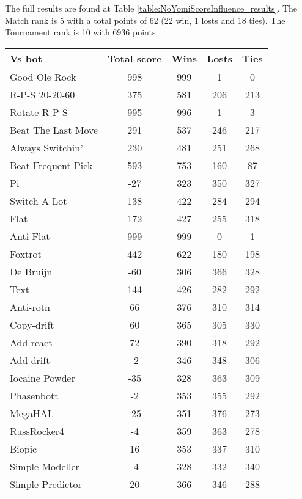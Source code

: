 The full results are found at Table \ref{table:NoYomiScoreInfluence_results}. The Match rank is 5 with a total points of 62 (22 win, 1 losts and 18 ties). The Tournament rank is 10 with 6936 points.

\begin{table*}
    \caption{NoYomiScoreInfluence results}
    \label{table:NoYomiScoreInfluence_results}
    \centering
    \begin{tabular}{|l|c|c|c|c|}
        \hline
        \textbf{Vs bot} & \textbf{Total score} & \textbf{Wins} & \textbf{Losts} & \textbf{Ties} \\ \hline
Good Ole Rock & 998 & 999 & 1 & 0 \\ \hline 
R-P-S 20-20-60 & 375 & 581 & 206 & 213 \\ \hline 
Rotate R-P-S & 995 & 996 & 1 & 3 \\ \hline 
Beat The Last Move & 291 & 537 & 246 & 217 \\ \hline 
Always Switchin' & 230 & 481 & 251 & 268 \\ \hline 
Beat Frequent Pick & 593 & 753 & 160 & 87 \\ \hline 
Pi & -27 & 323 & 350 & 327 \\ \hline 
Switch A Lot & 138 & 422 & 284 & 294 \\ \hline 
Flat & 172 & 427 & 255 & 318 \\ \hline 
Anti-Flat & 999 & 999 & 0 & 1 \\ \hline 
Foxtrot & 442 & 622 & 180 & 198 \\ \hline 
De Bruijn & -60 & 306 & 366 & 328 \\ \hline 
Text & 144 & 426 & 282 & 292 \\ \hline 
Anti-rotn & 66 & 376 & 310 & 314 \\ \hline 
Copy-drift & 60 & 365 & 305 & 330 \\ \hline 
Add-react & 72 & 390 & 318 & 292 \\ \hline 
Add-drift & -2 & 346 & 348 & 306 \\ \hline 
Iocaine Powder & -35 & 328 & 363 & 309 \\ \hline 
Phasenbott & -2 & 353 & 355 & 292 \\ \hline 
MegaHAL & -25 & 351 & 376 & 273 \\ \hline 
RussRocker4 & -4 & 359 & 363 & 278 \\ \hline 
Biopic & 16 & 353 & 337 & 310 \\ \hline 
Simple Modeller & -4 & 328 & 332 & 340 \\ \hline 
Simple Predictor & 20 & 366 & 346 & 288 \\ \hline 

\end{tabular}
\end{table*}
